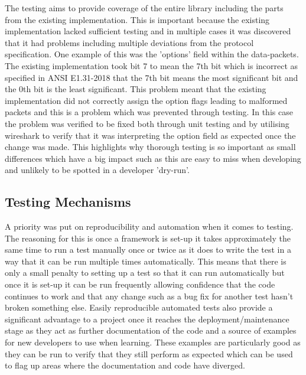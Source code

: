 \documentclass[11pt,a4paper]{report}
\begin{document}
The testing aims to provide coverage of the entire library including the parts from the existing implementation. This is important because the existing implementation lacked sufficient testing and in multiple cases it was discovered that it had problems including multiple deviations from the protocol specification. One example of this was the 'options' field within the data-packets. The existing implementation took bit 7 to mean the 7th bit which is incorrect as specified in ANSI E1.31-2018 that the 7th bit means the most significant bit and the 0th bit is the least significant. This problem meant that the existing implementation did not correctly assign the option flags leading to malformed packets and this is a problem which was prevented through testing. In this case the problem was verified to be fixed both through unit testing and by utilising wireshark to verify that it was interpreting the option field as expected once the change was made. This highlights why thorough testing is so important as small differences which have a big impact such as this are easy to miss when developing and unlikely to be spotted in a developer 'dry-run'.

\subsection{Testing Mechanisms}
A priority was put on reproducibility and automation when it comes to testing. The reasoning for this is once a framework is set-up it takes approximately the same time to run a test manually once or twice as it does to write the test in a way that it can be run multiple times automatically. This means that there is only a small penalty to setting up a test so that it can run automatically but once it is set-up it can be run frequently allowing confidence that the code continues to work and that any change such as a bug fix for another test hasn't broken something else. Easily reproducible automated tests also provide a significant advantage to a project once it reaches the deployment/maintenance stage as they act as further documentation of the code and a source of examples for new developers to use when learning. These examples are particularly good as they can be run to verify that they still perform as expected which can be used to flag up areas where the documentation and code have diverged.\\
\end{document}
